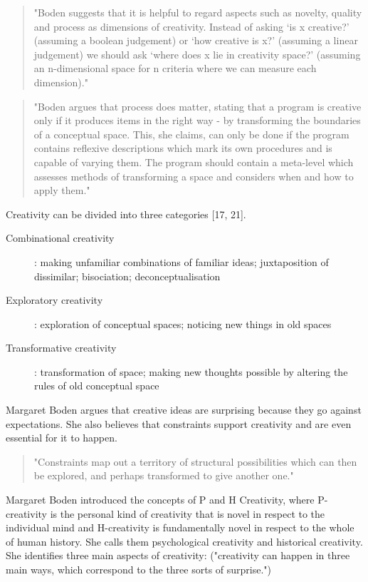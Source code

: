 \begin{quote}
  "Boden suggests that it is helpful to regard aspects such as novelty, quality and process as dimensions of creativity. Instead of asking ‘is x creative?’ (assuming a boolean judgement) or ‘how creative is x?’ (assuming a linear judgement) we should ask ‘where does x lie in creativity space?’ (assuming an n-dimensional space for n criteria where we can measure each dimension)." \citep[p.8]{Pease2001}
\end{quote}

\begin{quote}
  "Boden argues that process does matter, stating that a program is creative only if it produces items in the right way - by transforming the boundaries of a conceptual space. This, she claims, can only be done if the program contains reflexive descriptions which mark its own procedures and is capable of varying them. The program should contain a meta-level which assesses methods of transforming a space and considers when and how to apply them."  \citep[p.8]{Pease2001}
\end{quote}

Creativity can be divided into three categories \citep{Boden2003}[17, 21].

\begin{description}
  \item [Combinational creativity]: making unfamiliar combinations of familiar ideas; juxtaposition of dissimilar; bisociation; deconceptualisation
  \item [Exploratory creativity]: exploration of conceptual spaces; noticing new things in old spaces
  \item [Transformative creativity]: transformation of space; making new thoughts possible by altering the rules of old conceptual space
\end{description}

Margaret Boden \citep{Boden2003} argues that creative ideas are surprising because they go against expectations. She also believes that constraints support creativity and are even essential for it to happen.

\begin{quote}
  "Constraints map out a territory of structural possibilities which can then be explored, and perhaps transformed to give another one."\citep{Boden2003}
\end{quote}

Margaret Boden \citep{Boden2003} introduced the concepts of P and H Creativity, where P-creativity is the personal kind of creativity that is novel in respect to the individual mind and H-creativity is fundamentally novel in respect to the whole of human history. She calls them psychological creativity and historical creativity. She identifies three main aspects of creativity: ("creativity can happen in three main ways, which correspond to the three sorts of surprise.")

